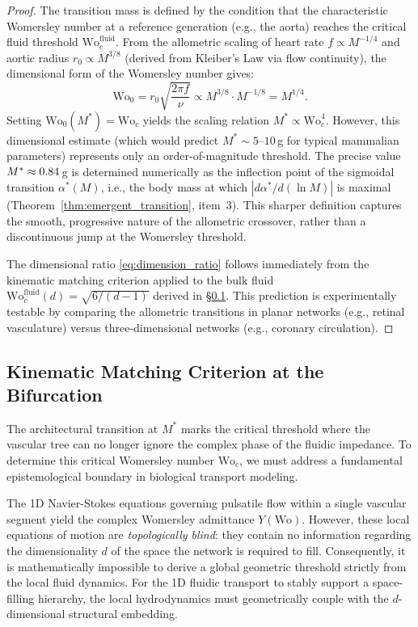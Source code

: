 \begin{proof}
The transition mass is defined by the condition that the characteristic
Womersley number at a reference generation (e.g., the aorta) reaches the
critical fluid threshold $\mathrm{Wo}_c^{\mathrm{fluid}}$. From the allometric
scaling of heart rate $f \propto M^{-1/4}$ and aortic radius $r_0 \propto
M^{3/8}$ (derived from Kleiber's Law via flow continuity), the dimensional form
of the Womersley number gives:
\begin{equation}
    \mathrm{Wo}_0 = r_0 \sqrt{\frac{2\pi f}{\nu}}
    \propto M^{3/8} \cdot M^{-1/8} = M^{1/4}.
\end{equation}
Setting $\mathrm{Wo}_0(M^*) = \mathrm{Wo}_c$ yields the scaling relation $M^*
\propto \mathrm{Wo}_c^4$. However, this dimensional estimate (which would
predict $M^* \sim 5$--$10\,$g for typical mammalian parameters) represents only
an order-of-magnitude threshold. The precise value $M^* \approx 0.84\,$g is
determined numerically as the inflection point of the sigmoidal transition
$\alpha^*(M)$, i.e., the body mass at which $|d\alpha^*/d(\ln M)|$ is maximal
(Theorem~\ref{thm:emergent_transition}, item~3). This sharper definition
captures the smooth, progressive nature of the allometric crossover, rather than
a discontinuous jump at the Womersley threshold.

The dimensional ratio \eqref{eq:dimension_ratio} follows immediately from the
kinematic matching criterion applied to the bulk fluid
$\mathrm{Wo}_c^{\mathrm{fluid}}(d) = \sqrt{6/(d-1)}$ derived in
\S\ref{sec:isotropic_stress}. This prediction is experimentally testable by
comparing the allometric transitions in planar networks (e.g., retinal
vasculature) versus three-dimensional networks (e.g., coronary circulation).
\end{proof}

\subsection{Kinematic Matching Criterion at the Bifurcation}
\label{sec:isotropic_stress}

The architectural transition at $M^*$ marks the critical threshold where the
vascular tree can no longer ignore the complex phase of the fluidic impedance.
To determine this critical Womersley number $\mathrm{Wo}_c$, we must address a
fundamental epistemological boundary in biological transport modeling.

The 1D Navier-Stokes equations governing pulsatile flow within a single vascular
segment yield the complex Womersley admittance $Y(\mathrm{Wo})$. However, these
local equations of motion are \emph{topologically blind}: they contain no
information regarding the dimensionality $d$ of the space the network is
required to fill. Consequently, it is mathematically impossible to derive a
global geometric threshold strictly from the local fluid dynamics. For the 1D
fluidic transport to stably support a space-filling hierarchy, the local
hydrodynamics must geometrically couple with the $d$-dimensional structural
embedding.


